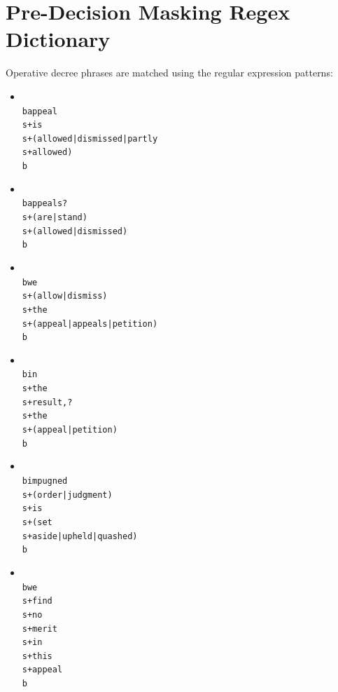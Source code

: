 \documentclass[journal,10pt,twocolumn]{IEEEtran}
\begin{document}
\section{Pre-Decision Masking Regex Dictionary}
Operative decree phrases are matched using the regular expression patterns:
\begin{itemize}
    \item \texttt{\\bappeal\\s+is\\s+(allowed|dismissed|partly\\s+allowed)\\b}
    \item \texttt{\\bappeals?\\s+(are|stand)\\s+(allowed|dismissed)\\b}
    \item \texttt{\\bwe\\s+(allow|dismiss)\\s+the\\s+(appeal|appeals|petition)\\b}
    \item \texttt{\\bin\\s+the\\s+result,?\\s+the\\s+(appeal|petition)\\b}
    \item \texttt{\\bimpugned\\s+(order|judgment)\\s+is\\s+(set\\s+aside|upheld|quashed)\\b}
    \item \texttt{\\bwe\\s+find\\s+no\\s+merit\\s+in\\s+this\\s+appeal\\b}
\end{itemize}
\end{document}
